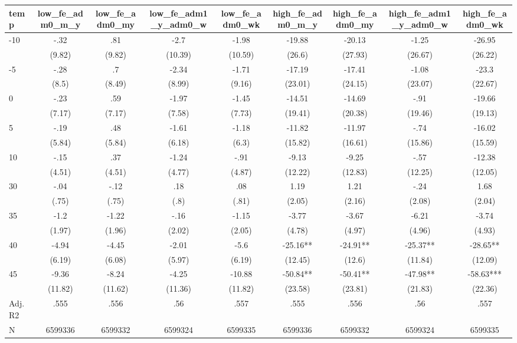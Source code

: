 \documentclass[]{article}
\begin{document}
\begin{tabular}{lcccccccc} \hline
temp & low\_fe\_adm0\_m\_y & low\_fe\_adm0\_my & low\_fe\_adm1\_y\_adm0\_w & low\_fe\_adm0\_wk & high\_fe\_adm0\_m\_y & high\_fe\_adm0\_my & high\_fe\_adm1\_y\_adm0\_w & high\_fe\_adm0\_wk \\ \hline
-10 & -.32 & .81 & -2.7 & -1.98 & -19.88 & -20.13 & -1.25 & -26.95 \\
 & (9.82) & (9.82) & (10.39) & (10.59) & (26.6) & (27.93) & (26.67) & (26.22) \\
-5 & -.28 & .7 & -2.34 & -1.71 & -17.19 & -17.41 & -1.08 & -23.3 \\
 & (8.5) & (8.49) & (8.99) & (9.16) & (23.01) & (24.15) & (23.07) & (22.67) \\
0 & -.23 & .59 & -1.97 & -1.45 & -14.51 & -14.69 & -.91 & -19.66 \\
 & (7.17) & (7.17) & (7.58) & (7.73) & (19.41) & (20.38) & (19.46) & (19.13) \\
5 & -.19 & .48 & -1.61 & -1.18 & -11.82 & -11.97 & -.74 & -16.02 \\
 & (5.84) & (5.84) & (6.18) & (6.3) & (15.82) & (16.61) & (15.86) & (15.59) \\
10 & -.15 & .37 & -1.24 & -.91 & -9.13 & -9.25 & -.57 & -12.38 \\
 & (4.51) & (4.51) & (4.77) & (4.87) & (12.22) & (12.83) & (12.25) & (12.05) \\
30 & -.04 & -.12 & .18 & .08 & 1.19 & 1.21 & -.24 & 1.68 \\
 & (.75) & (.75) & (.8) & (.81) & (2.05) & (2.16) & (2.08) & (2.04) \\
35 & -1.2 & -1.22 & -.16 & -1.15 & -3.77 & -3.67 & -6.21 & -3.74 \\
 & (1.97) & (1.96) & (2.02) & (2.05) & (4.78) & (4.97) & (4.96) & (4.93) \\
40 & -4.94 & -4.45 & -2.01 & -5.6 & -25.16** & -24.91** & -25.37** & -28.65** \\
 & (6.19) & (6.08) & (5.97) & (6.19) & (12.45) & (12.6) & (11.84) & (12.09) \\
45 & -9.36 & -8.24 & -4.25 & -10.88 & -50.84** & -50.41** & -47.98** & -58.63*** \\
 & (11.82) & (11.62) & (11.36) & (11.82) & (23.58) & (23.81) & (21.83) & (22.36) \\
\hline Adj. R2 & .555 & .556 & .56 & .557 & .555 & .556 & .56 & .557 \\
 N & 6599336 & 6599332 & 6599324 & 6599335 & 6599336 & 6599332 & 6599324 & 6599335 \\ \hline
\end{tabular}
\end{document}
